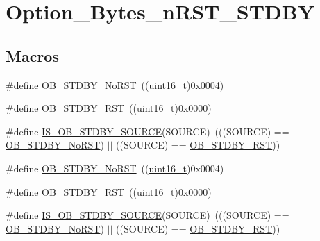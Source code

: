 \hypertarget{group___option___bytes__n_r_s_t___s_t_d_b_y}{}\section{Option\+\_\+\+Bytes\+\_\+n\+R\+S\+T\+\_\+\+S\+T\+D\+BY}
\label{group___option___bytes__n_r_s_t___s_t_d_b_y}
\subsection*{Macros}
\begin{DoxyCompactItemize}
\item 
\#define \hyperlink{group___option___bytes__n_r_s_t___s_t_d_b_y_ga9588443b20719498422aeb72b65de839}{O\+B\+\_\+\+S\+T\+D\+B\+Y\+\_\+\+No\+R\+ST}~((\hyperlink{_p_e___types_8h_a1f1825b69244eb3ad2c7165ddc99c956}{uint16\+\_\+t})0x0004)
\item 
\#define \hyperlink{group___option___bytes__n_r_s_t___s_t_d_b_y_ga69451a6f69247528f58735c9c83499ce}{O\+B\+\_\+\+S\+T\+D\+B\+Y\+\_\+\+R\+ST}~((\hyperlink{_p_e___types_8h_a1f1825b69244eb3ad2c7165ddc99c956}{uint16\+\_\+t})0x0000)
\item 
\#define \hyperlink{group___option___bytes__n_r_s_t___s_t_d_b_y_ga8a05393df3a5e89551b4e2e1e8c5b884}{I\+S\+\_\+\+O\+B\+\_\+\+S\+T\+D\+B\+Y\+\_\+\+S\+O\+U\+R\+CE}(S\+O\+U\+R\+CE)~(((S\+O\+U\+R\+CE) == \hyperlink{group___option___bytes__n_r_s_t___s_t_d_b_y_ga9588443b20719498422aeb72b65de839}{O\+B\+\_\+\+S\+T\+D\+B\+Y\+\_\+\+No\+R\+ST}) $\vert$$\vert$ ((S\+O\+U\+R\+CE) == \hyperlink{group___option___bytes__n_r_s_t___s_t_d_b_y_ga69451a6f69247528f58735c9c83499ce}{O\+B\+\_\+\+S\+T\+D\+B\+Y\+\_\+\+R\+ST}))
\item 
\#define \hyperlink{group___option___bytes__n_r_s_t___s_t_d_b_y_ga9588443b20719498422aeb72b65de839}{O\+B\+\_\+\+S\+T\+D\+B\+Y\+\_\+\+No\+R\+ST}~((\hyperlink{_p_e___types_8h_a1f1825b69244eb3ad2c7165ddc99c956}{uint16\+\_\+t})0x0004)
\item 
\#define \hyperlink{group___option___bytes__n_r_s_t___s_t_d_b_y_ga69451a6f69247528f58735c9c83499ce}{O\+B\+\_\+\+S\+T\+D\+B\+Y\+\_\+\+R\+ST}~((\hyperlink{_p_e___types_8h_a1f1825b69244eb3ad2c7165ddc99c956}{uint16\+\_\+t})0x0000)
\item 
\#define \hyperlink{group___option___bytes__n_r_s_t___s_t_d_b_y_ga8a05393df3a5e89551b4e2e1e8c5b884}{I\+S\+\_\+\+O\+B\+\_\+\+S\+T\+D\+B\+Y\+\_\+\+S\+O\+U\+R\+CE}(S\+O\+U\+R\+CE)~(((S\+O\+U\+R\+CE) == \hyperlink{group___option___bytes__n_r_s_t___s_t_d_b_y_ga9588443b20719498422aeb72b65de839}{O\+B\+\_\+\+S\+T\+D\+B\+Y\+\_\+\+No\+R\+ST}) $\vert$$\vert$ ((S\+O\+U\+R\+CE) == \hyperlink{group___option___bytes__n_r_s_t___s_t_d_b_y_ga69451a6f69247528f58735c9c83499ce}{O\+B\+\_\+\+S\+T\+D\+B\+Y\+\_\+\+R\+ST}))
\end{DoxyCompactItemize}


